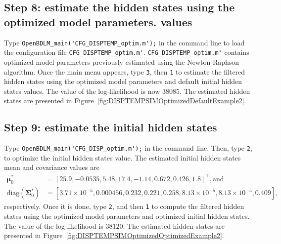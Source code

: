 \subsection{Step 8: estimate the hidden states using the optimized model parameters. values}

Type \colorbox{light-gray}{\lstinline[basicstyle = \mlttfamily \small, backgroundcolor = \color{light-gray}]!OpenBDLM_main('CFG_DISPTEMP_optim.m');!} in the \MATLAB{} command line to load the configuration file  \lstinline[basicstyle = \mlttfamily \small, backgroundcolor = \color{light-gray}]!CFG_DISPTEMP_optim.m'!.
 \lstinline[basicstyle = \mlttfamily \small, backgroundcolor = \color{light-gray}]!CFG_DISPTEMP_optim.m'! contains optimized model parameters previously estimated using the Newton-Raphson algorithm.
Once the main menu appears, type  \colorbox{light-gray}{\lstinline[basicstyle = \mlttfamily \small, backgroundcolor = \color{light-gray}]!3!}, then \colorbox{light-gray}{\lstinline[basicstyle = \mlttfamily \small, backgroundcolor = \color{light-gray}]!1!} to estimate the filtered hidden states using the optimized model parameters and default initial hidden states values.
The value of the log-likelihood is now $38085$.
The estimated hidden states are presented in Figure~\ref{fig:DISPTEMPSIMOptimizedDefaultExample2}.

\subsection{Step 9: estimate the initial hidden states}

Type \colorbox{light-gray}{\lstinline[basicstyle = \mlttfamily \small, backgroundcolor = \color{light-gray}]!OpenBDLM_main('CFG_DISP_optim.m');!} in the \MATLAB{} command line.
Then, type  \colorbox{light-gray}{\lstinline[basicstyle = \mlttfamily \small, backgroundcolor = \color{light-gray}]!2!}, to optimize the initial hidden states value.
The estimated initial hidden states mean and covariance values are 
\begin{align*}
\bm \mu^{*}_{0} & = [	25.9,  	-0.0535,	5.48 , 	17.4  ,	-1.14 ,	0.672 ,	0.426 ,	1.8 ]^{\intercal}, \text{and} \\
 \text{diag}(\bm\Sigma^{*}_{0}) & = [	3.71\times10^{-5} ,	0.000456,	0.232, 	0.221 ,	0.258 ,	8.13\times10^{-5}, 	8.13\times10^{-5} ,	0.409   ], 
 \end{align*}
 respectively.
Once it is done, type  \colorbox{light-gray}{\lstinline[basicstyle = \mlttfamily \small, backgroundcolor = \color{light-gray}]!2!}, and then  \colorbox{light-gray}{\lstinline[basicstyle = \mlttfamily \small, backgroundcolor = \color{light-gray}]!1!} to compute the filtered hidden states using the optimized model parameters and optimized initial hidden states.
The value of the log-likelihood is $38120$.
The estimated hidden states are presented in Figure~\ref{fig:DISPTEMPSIMOptimizedOptimizedExample2}.



